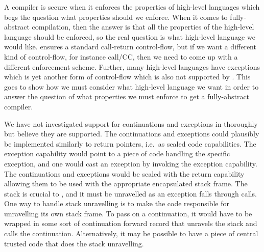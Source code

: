 

\begin{jversion}
  A compiler is secure when it enforces the properties of high-level languages which begs the question what properties should we enforce.
  When it comes to fully-abstract compilation, then the answer is that all the properties of the high-level language should be enforced, so the real question is what high-level language we would like.
  \stktokens{} ensures a standard call-return control-flow, but if we want a different kind of control-flow, for instance call/CC, then we need to come up with a different enforcement scheme.
  Further, many high-level languages have exceptions which is yet another form of control-flow which is also not supported by \stktokens{}.
  This goes to show how we must consider what high-level language we want in order to answer the question of what properties we must enforce to get a fully-abstract compiler.

  We have not investigated support for continuations and exceptions in \stktokens{} thoroughly but believe they are supported.
  The continuations and exceptions could plausibly be implemented similarly to return pointers, i.e.\ as sealed code capabilities.
  The exception capability would point to a piece of code handling the specific exception, and one would cast an exception by invoking the exception capability.
  The continuations and exceptions would be sealed with the return capability allowing them to be used with the appropriate encapsulated stack frame.
  The stack is crucial to \stktokens{}, and it must be unravelled as an exception falls through calls.
  One way to handle stack unravelling is to make the code responsible for unravelling its own stack frame.
  To pass on a continuation, it would have to be wrapped in some sort of continuation forward record that unravels the stack and calls the continuation.
  Alternatively, it may be possible to have a piece of central trusted code that does the stack unravelling.


\end{jversion}
